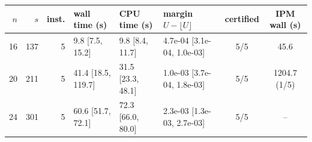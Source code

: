 \begin{tabular}{r r r l l l c c}\toprule
$n$ & $s$ & inst. & wall time (s) & CPU time (s) & margin $U-\lfloor U\rfloor$ & certified & IPM wall (s) \\\midrule
16 & 137 & 5 & 9.8 [7.5, 15.2] & 9.8 [8.4, 11.7] & 4.7e-04 [3.1e-04, 1.0e-03] & 5/5 & 45.6 \\
20 & 211 & 5 & 41.4 [18.5, 119.7] & 31.5 [23.3, 48.1] & 1.0e-03 [3.7e-04, 1.8e-03] & 5/5 & 1204.7 (1/5) \\
24 & 301 & 5 & 60.6 [51.7, 72.1] & 72.3 [66.0, 80.0] & 2.3e-03 [1.3e-03, 2.7e-03] & 5/5 & -- \\
\bottomrule\end{tabular}
